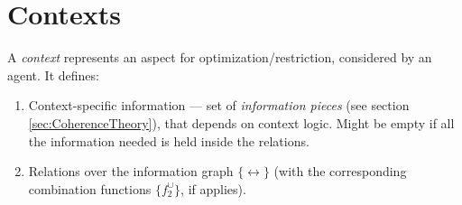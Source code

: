 \documentclass[../header]{subfiles}
\begin{document}
\providecommand{\rootdir}{..}


\section{Contexts}
\label{sec:solution-contexts}


A \emph{context} represents an aspect for optimization/restriction, considered
by an agent. It defines:
\begin{enumerate}
  \item Context-specific information --- set of \emph{information pieces}
        (see section \ref{sec:CoherenceTheory}), that depends on context logic.
        Might be empty if all the information needed is held inside the relations.
  \item Relations over the information graph $\{\rel\}$
        (with the corresponding combination functions $\{f^\cup_2\}$, if applies).


\end{enumerate}
\end{document}
